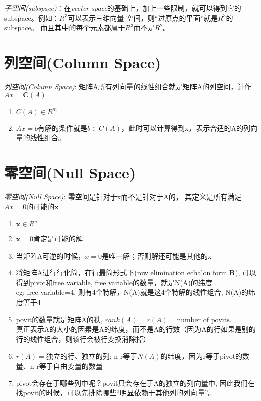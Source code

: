 \documentclass{book}
\begin{document}
\textit{子空间(subspace)}：在\textit{vecter space}的基础上，加上一些限制，就可以得到它的subspace。例如：$R^3$可以表示三维向量
空间，则“过原点的平面”就是$R^3$的subspace。
而且其中的每个元素都属于$R^3$而不是$R^2$。
\section{列空间(Column Space)}
\textit{列空间(Column Space)}: 矩阵A所有列向量的线性组合就是矩阵A的列空间，计作$Ax=\boldsymbol{C}(A)$
\begin{enumerate}
  \item $C(A) \in R^m$
  \item $Ax=b$有解的条件就是$b\in C(A)$，此时可以计算得到x，表示合适的A的列向量的线性组合。
\end{enumerate}

\section{零空间(Null Space)}
\textit{零空间(Null Space)}: 零空间是针对于x而不是针对于A的，
其定义是所有满足$Ax=0$的可能的$\boldsymbol{x}$ 
\begin{enumerate}
  \item $\boldsymbol{x} \in R^n$
  \item $\boldsymbol{x}=0$肯定是可能的解
  \item 当矩阵A可逆的时候，$x=0$是唯一解；否则解还可能是其他的x
  \item 将矩阵A进行行化简，在行最简形式下(row elimination echalon form $\boldsymbol{R}$), 可以得到pivot和free variable,
    free variable的数量，就是N(A)的纬度\\ 
    eg: free variable=4, 则有4个特解，N(A)就是这4个特解的线性组合, N(A)的纬度等于4
  \item povit的数量就是矩阵A的秩, $rank(A)=r(A)=\text{number of povits}.$\\ 
    真正表示A的大小的因素是A的纬度，而不是A的行数（因为A的行如果是别的行的线性组合，则该行会被行变换消除掉）
  \item $r(A)=$独立的行、独立的列; n-r等于$N(A)$的纬度，因为r等于pivot的数量、n-r等于自由变量的数量
  \item pivot会存在于哪些列中呢？povit只会存在于A的独立的列向量中, 因此我们在找povit的时候，可以先排除哪些“明显依赖于其他列的列向量”。
\end{enumerate}
\end{document}
